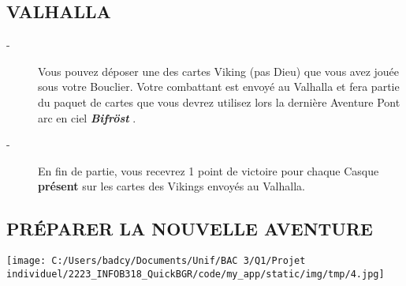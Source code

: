 \documentclass{scrartcl}%
\begin{document}
%
\subsection{ VALHALLA
}%
\label{subsec:VALHALLA}%
\begin{description}%
\item[{-} ]%
%
 Vous pouvez déposer une des cartes Viking (pas Dieu) que vous avez jouée sous votre Bouclier. Votre combattant est envoyé au Valhalla et fera partie du paquet de cartes que vous devrez utilisez lors la dernière Aventure Pont arc en ciel %
\textcolor{mygreen}{\textbf{\textit{Bifröst}}}%
.
%
\item[{-} ]%
%
 En fin de partie, vous recevrez 1 point de victoire pour chaque Casque %
\textcolor{mygreen}{%
\textbf{présent}%
}%
\textit{ }%
 sur les cartes des Vikings envoyés au Valhalla.
%
\end{description}

%
\subsection{ PRÉPARER LA NOUVELLE AVENTURE
}%
\label{subsec:PRPARERLANOUVELLEAVENTURE}%
%
\begin{center}\texttt{[image: C:/Users/badcy/Documents/Unif/BAC 3/Q1/Projet individuel/2223\_INFOB318\_QuickBGR/code/my\_app/static/img/tmp/4.jpg]}\end{center}%
\end{document}

